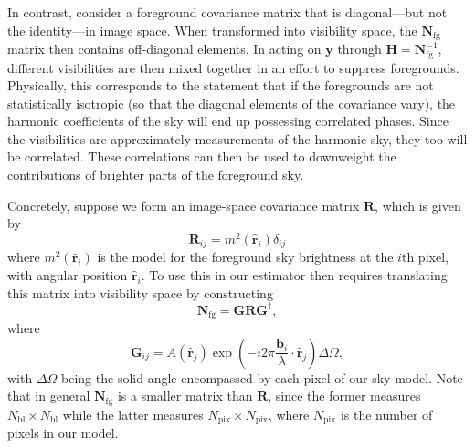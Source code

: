 \documentclass[twocolumn,apj,numberedappendix]{emulateapj}
\newcommand{\y}{\mathbf{y}}
\newcommand{\Hmat}{\mathbf{H}}
\newcommand{\Nfg}{\mathbf{N}_{\textrm{fg}}}
\newcommand{\R}{\mathbf{R}}
\newcommand{\rhat}{\hat{\mathbf{r}}}
\begin{document}
In contrast, consider a foreground covariance matrix that is diagonal---but not the identity---in image space. When transformed into visibility space, the $\Nfg$ matrix then contains off-diagonal elements. In acting on $\y$ through $\Hmat = \Nfg^{-1}$, different visibilities are then mixed together in an effort to suppress foregrounds. Physically, this corresponds to the statement that if the foregrounds are not statistically isotropic (so that the diagonal elements of the covariance vary), the harmonic coefficients of the sky will end up possessing correlated phases. Since the visibilities are approximately measurements of the harmonic sky, they too will be correlated. These correlations can then be used to downweight the contributions of brighter parts of the foreground sky.

Concretely, suppose we form an image-space covariance matrix $\R$, which is given by
\begin{equation}
\label{eq:Rmatrix}
\R_{ij} = m^2(\rhat_i) \delta_{ij}
\end{equation}
where $m^2(\rhat_i)$ is the model for the foreground sky brightness at the $i$th pixel, with angular position $\rhat_i$. To use this in our estimator then requires translating this matrix into visibility space by constructing
\begin{equation}
\label{eq:GRG}
\Nfg = \mathbf{G} \R \mathbf{G}^\dagger,
\end{equation}
where
\begin{equation}
\mathbf{G}_{ij} = A(\rhat_j)\exp\left(-i2\pi \frac{\mathbf{b_\textit{i}}}{\lambda} \cdot \boldsymbol \rhat_j\right) \Delta \Omega,
\end{equation}
with $\Delta \Omega$ being the solid angle encompassed by each pixel of our sky model. Note that in general $\Nfg$ is a smaller matrix than $\R$, since the former measures $N_\textrm{bl} \times N_\textrm{bl}$ while the latter measures $N_\textrm{pix} \times N_\textrm{pix}$, where $N_\textrm{pix}$ is the number of pixels in our model.
\end{document}
